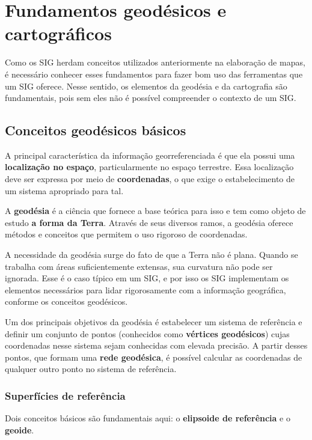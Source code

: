 \chapter{Fundamentos geodésicos e cartográficos}

Como os SIG herdam conceitos utilizados anteriormente na elaboração de mapas, é necessário conhecer esses fundamentos para fazer bom uso das ferramentas que um SIG oferece. Nesse sentido, os elementos da geodésia e da cartografia são fundamentais, pois sem eles não é possível compreender o contexto de um SIG.

\section{Conceitos geodésicos básicos}
\pagestyle{fancy}

A principal característica da informação georreferenciada é que ela possui uma \textbf{localização no espaço}, particularmente no espaço terrestre. Essa localização deve ser expressa por meio de \textbf{coordenadas}, o que exige o estabelecimento de um sistema apropriado para tal. 

A \textbf{geodésia} é a ciência que fornece a base teórica para isso e tem como objeto de estudo \textbf{a forma da Terra}. Através de seus diversos ramos, a geodésia oferece métodos e conceitos que permitem o uso rigoroso de coordenadas.

A necessidade da geodésia surge do fato de que a Terra não é plana. Quando se trabalha com áreas suficientemente extensas, sua curvatura não pode ser ignorada. Esse é o caso típico em um SIG, e por isso os SIG implementam os elementos necessários para lidar rigorosamente com a informação geográfica, conforme os conceitos geodésicos.

Um dos principais objetivos da geodésia é estabelecer um sistema de referência e definir um conjunto de pontos (conhecidos como \textbf{vértices geodésicos}) cujas coordenadas nesse sistema sejam conhecidas com elevada precisão. A partir desses pontos, que formam uma \textbf{rede geodésica}, é possível calcular as coordenadas de qualquer outro ponto no sistema de referência.

\subsection{Superfícies de referência}

Dois conceitos básicos são fundamentais aqui: o \textbf{elipsoide de referência} e o \textbf{geoide}.

